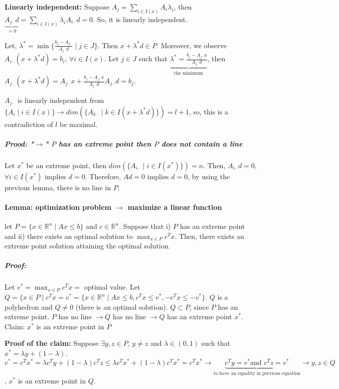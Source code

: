 \documentclass[main]{subfiles}
\begin{document}
\begin{adjustwidth}{2.5em}{0pt}
\textbf{Linearly independent:} Suppose $A_{j} = \sum_{i \in I(x)} A_{i}\lambda_{i}$, then $\underbrace{A_{j\cdot}d}_{=0} = \sum_{i \in I(x)} \lambda_{i} A_{i\cdot} d = 0$. So, it is linearly independent.
\end{adjustwidth}

Let, $\lambda^{*} = \min \{\frac{b_{j} - A_{j\cdot}}{A_{j\cdot}d} \mid j \in J \}$. Then $x + \lambda^{*} d \in P$. Moreover, we observe $A_{i\cdot}(x + \lambda^{*}d) = b_{i}$, $\forall i \in I(x)$.
Let $j \in J$ such that $\underbrace{ \lambda^{*} = \frac{b_{j} - A_{j\cdot}x}{A_{j\cdot}d}}_{\text{the minimum}}$, then $A_{j\cdot}(x + \lambda^{*}d) = A_{j\cdot}x + \frac{b_{j} - A_{j\cdot}x}{A_{j\cdot}d} A_{j\cdot}d = b_{j}$.

$A_{j\cdot}$ is linearly independent from $\{A_{i} \mid i \in I(x) \} \rightarrow dim(\{A_{k\cdot} \mid k \in I(x + \lambda^{*}d)\}) = l+1$, so, this is a contradiction of $l$ be maximal.

\subparagraph{Prood: "$\rightarrow$" $P$ has an extreme point then $P$ does not contain a line}
Let $x^{*}$ be an extreme point, then $dim(\{A_{i\cdot} \mid i \in I(x^{*})\}) = n$. Then, $A_{i\cdot}d = 0$, $\forall i \in I(x^{*})$ implies $d=0$. Therefore, $Ad=0$ implies $d=0$, by using the previous lemma, there is no line in $P$.

\paragraph{Lemma: optimization problem $\rightarrow$ maximize a linear function}
let $P = \{ x \in \mathbb{R}^{n} \mid Ax \leq b \}$ and $c \in \mathbb{R}^{n}$. Suppose that i) $P$ has an extreme point and ii) there exists an optimal solution to $\displaystyle \max_{x \in P} c^{T}x$. Then, there exists an extreme point solution attaining the optimal solution.

\subparagraph{Proof:} Let $v^{*} = \displaystyle \max_{x \in P} c^{T}x =$ optimal value.
Let $Q = \{x \in P \mid c^{T}x = v^{*} = \{x \in \mathbb{R}^{n} \mid Ax \leq b, c^{T}x \leq v^{*}, -c^{T}x \leq -v^{*} \}$. $Q$ is a polyhedron and $Q \neq 0$ (there is an optimal solution).
$Q \subset P$, since $P$ has an extreme point.
$P$ has no line $\rightarrow Q$ has no line $\rightarrow Q$ has an extreme point $x^{*}$.
Claim: $x^{*}$ is an extreme point in $P$
\begin{adjustwidth}{2.5em}{0pt}
\textbf{Proof of the claim:}
Suppose $\exists y, z \in P \text{, } y \neq z$ and $ \lambda \in (0,1)$ such that $x^{*} = \lambda y + (1-\lambda) $.
$v^{*} = c^{T}x^{*} = \lambda c^{T}y + (1-\lambda)c^{T}z \leq \lambda c^{T}x^{*} + (1-\lambda)c^{T}x^{*} = c^{T}x^{*} \rightarrow \underbrace{ c^{T}y = v^{*} \text{and }c^{T}z = v^{*}}_{\text{to have an equality in previous equation}} \rightarrow y, z \in Q$, $x^{*}$ is an extreme point in $Q$.
\end{adjustwidth}
\end{document}
